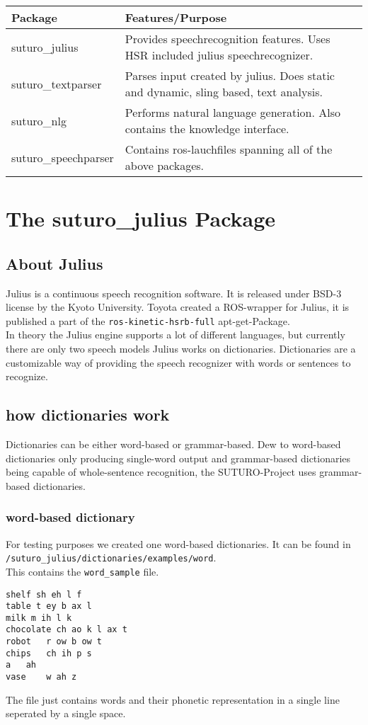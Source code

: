 \documentclass[main.tex]{subfiles}
\begin{document}
    \begin{tabular}{|l|p{9cm}|}
        \hline
        \textbf{Package} & \textbf{Features/Purpose} \\
        \hline
        suturo\_julius & Provides speechrecognition features. Uses HSR included julius speechrecognizer. \\
        \hline 
        suturo\_textparser & Parses input created by julius. Does static and dynamic, sling based, text analysis. \\
        \hline
        suturo\_nlg & Performs natural language generation. Also contains the knowledge interface. \\
        \hline 
        suturo\_speechparser & Contains ros-lauchfiles spanning all of the above packages.\\
        \hline
    \end{tabular}

\newpage
\section{The suturo\_julius Package}

    \subsection{About Julius}
      Julius is a continuous speech recognition software. It is released under BSD-3 license by the Kyoto University. Toyota created a ROS-wrapper for Julius, it is published a part of the \texttt{ros-kinetic-hsrb-full} apt-get-Package.\\
      In theory the Julius engine supports a lot of different languages, but currently there are only two speech models
     Julius works on dictionaries. Dictionaries are a customizable way of providing the speech recognizer with words or sentences to recognize.
    \subsection{how dictionaries work}
      Dictionaries can be either word-based or grammar-based. Dew to word-based dictionaries only producing single-word output and grammar-based dictionaries being capable of whole-sentence recognition, the SUTURO-Project uses grammar-based dictionaries.
    
        \subsubsection{word-based dictionary}
            For testing purposes we created one word-based dictionaries. It can be found in \lstinline|/suturo_julius/dictionaries/examples/word|.\\
            This contains the \texttt{word\_sample} file.\\
            \begin{lstlisting}
shelf sh eh l f
table t ey b ax l
milk m ih l k
chocolate ch ao k l ax t
robot	r ow b ow t
chips	ch ih p s
a	ah
vase	w ah z
            \end{lstlisting}
            The file just contains words and their phonetic representation in a single line seperated by a single space.
            
\end{document}
